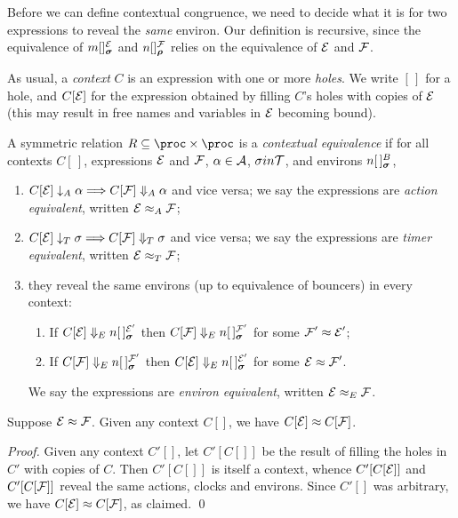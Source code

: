 \documentclass[orivec,envcountsame]{llncs}
\newcommand{\Exhibits}[1]{\mathrel{\downarrow_{#1}}}
\newcommand{\ExhibitsA}{\Exhibits{A}}
\newcommand{\ExhibitsT}{\Exhibits{T}}
\newcommand{\Reveals}[1]{\mathrel{\Downarrow_{#1}}}
\newcommand{\RevealsA}{\Reveals{A}}
\newcommand{\RevealsT}{\Reveals{T}}
\newcommand{\RevealsE}{\Reveals{E}}
\newcommand{\Eq}{\approx}
\newcommand{\EqA}{\mathrel{\Eq_{A}}}
\newcommand{\EqT}{\mathrel{\Eq_{T}}}
\newcommand{\EqE}{\mathrel{\Eq_{E}}}
\begin{document}
Before we can define contextual congruence, we need to decide what it is for 
two expressions to reveal the \emph{same} environ. Our definition is
recursive, since the equivalence of $\locv{m}{}{\expr}{\vec{\sigma}}$ and
$\locv{n}{}{\exprb}{\vec{\rho}}$ relies on the equivalence of $\text{$\mathcal{E}$}$ and
$\text{$\mathcal{F}$}$.

As usual, a \emph{context} $C$ is an expression with one or more
\emph{holes}. We write $[\,]$ for a hole, and $C[\text{$\mathcal{E}$}]$ for the expression
obtained by filling $C$'s holes with copies of $\text{$\mathcal{E}$}$ (this may result
in free names and variables in $\text{$\mathcal{E}$}$ becoming bound).

\begin{definition}

A symmetric relation $R \subseteq \proc \times \proc$ is a \emph{contextual
equivalence} if for all contexts $C[\,]$, expressions $\text{$\mathcal{E}$}$ and $\text{$\mathcal{F}$}$,
$\alpha \in \text{$\mathcal{A}$}$, $\sigma in \text{$\mathcal{T}$}$, and environs
$\locv{n}{\,}{B}{\vec{\sigma}}$,

\begin{enumerate}
\item
     $C[\expr] \ExhibitsA \alpha \Longrightarrow C[\exprb] \RevealsA \alpha$ and
     vice versa; we say the expressions are \emph{action equivalent}, written 
     $\expr \EqA \exprb$; 
\item
     $C[\expr] \ExhibitsT \sigma \Longrightarrow C[\exprb] \RevealsT \sigma$ and
     vice versa; we say the expressions are \emph{timer equivalent}, written 
     $\expr \EqT \exprb$; 
\item
     they reveal the same environs (up to equivalence of bouncers) in every 
     context:
     \begin{enumerate}
     \item
        If $C[\expr] \RevealsE \locv{n}{\,}{\expr'}{\vec{\sigma}}$
        then 
        $C[\exprb] \RevealsE \locv{n}{\,}{\exprb'}{\vec{\sigma}}$
        for some $\exprb' \Eq \expr'$;
     \item
        If $C[\exprb] \RevealsE \locv{n}{\,}{\exprb'}{\vec{\sigma}}$
        then
        $C[\expr] \RevealsE \locv{n}{\,}{\expr'}{\vec{\sigma}}$
        for some $\expr \Eq \exprb'$.
     \end{enumerate}
     We say the expressions are \emph{environ equivalent}, written $\expr \EqE 
     \exprb$.
\end{enumerate}
\end{definition}


\begin{proposition}
\label{prop:context-substitution} 
Suppose $\expr \Eq \exprb$. Given any context $C[]$, we have $C[\expr]
\Eq C[\exprb]$.
\end{proposition}
\begin{proof}
Given any context $C'[]$, let $C'[C[]]$ be the result of filling the
holes in $C'$ with copies of $C$. Then $C'[C[]]$ is itself a context,
whence $C'[C[\text{$\mathcal{E}$}]]$ and $C'[C[\text{$\mathcal{F}$}]]$ reveal the same actions,
clocks and environs. Since $C'[]$ was arbitrary, we have $C[\expr] \Eq
C[\exprb]$, as claimed.
\qed \end{proof}
\end{document}
